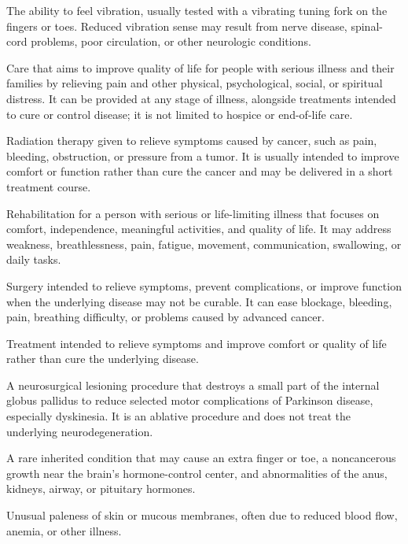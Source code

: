  The ability to feel vibration, usually tested with a vibrating tuning fork on the fingers or toes. Reduced vibration sense may result from nerve disease, spinal-cord problems, poor circulation, or other neurologic conditions.

 Care that aims to improve quality of life for people with serious illness and their
families by relieving pain and other physical, psychological, social, or spiritual distress.
It can be provided at any stage of illness, alongside treatments intended to cure or
control disease; it is not limited to hospice or end-of-life care.

 Radiation therapy given to relieve symptoms caused by cancer, such as pain, bleeding, obstruction, or pressure from a tumor. It is usually intended to improve comfort or function rather than cure the cancer and may be delivered in a short treatment course.

 Rehabilitation for a person with serious or life-limiting illness that focuses on comfort, independence, meaningful activities, and quality of life. It may address weakness, breathlessness, pain, fatigue, movement, communication, swallowing, or daily tasks.

 Surgery intended to relieve symptoms, prevent complications, or improve function when the underlying disease may not be curable. It can ease blockage, bleeding, pain, breathing difficulty, or problems caused by advanced cancer.

 Treatment intended to relieve symptoms and improve comfort or quality of life rather than cure the underlying disease.

 A neurosurgical lesioning procedure that destroys a small part of the internal globus pallidus to reduce selected motor complications of Parkinson disease, especially dyskinesia. It is an ablative procedure and does not treat the underlying neurodegeneration.

 A rare inherited condition that may cause an extra finger or toe, a noncancerous growth near the brain’s hormone-control center, and abnormalities of the anus, kidneys, airway, or pituitary hormones.

 Unusual paleness of skin or mucous membranes, often due to reduced blood flow, anemia, or other illness.

